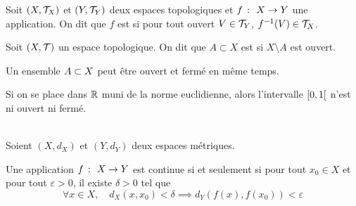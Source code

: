 \begin{definition}
    Soit \((X, \mathcal{T}_X)\) et \((Y, \mathcal{T}_Y)\) deux espaces topologiques
    et \(f\ \colon\  X \to Y\) une application.
    On dit que \(f\) est  si pour tout ouvert \(V \in \mathcal{T}_Y\),
    \(f^{-1}(V) \in \mathcal{T}_X\).
\end{definition}

\begin{definition}
    Soit \((X, \mathcal{T})\) un espace topologique.
    On dit que \(A \subset X\) est  si \(X \setminus A\) est ouvert.
\end{definition}

\begin{remark}
    Un ensemble \(A\subset X\) peut être ouvert et fermé en même temps.
\end{remark}

\begin{example}
    Si on se place dans \(\mathbb{R}\) muni de la norme euclidienne, alors
    l'intervalle \(\mathopen{}\left[0, 1\right[\mathclose{}\) n'est ni ouvert ni fermé.
\end{example}

\begin{proposition}\,\\
    Soient \((X, d_X)\) et \((Y, d_Y)\) deux espaces métriques.

    Une application \(f\ \colon\  X \to Y\) est continue si et seulement si 
    pour tout \(x_0 \in X\) et pour tout \(\varepsilon > 0\),
    il existe \(\delta > 0\) tel que
    \begin{equation*}
        \forall x \in X, \quad d_X(x, x_0) < \delta \implies d_Y(f(x), f(x_0)) < \varepsilon
    \end{equation*}
\end{proposition}

